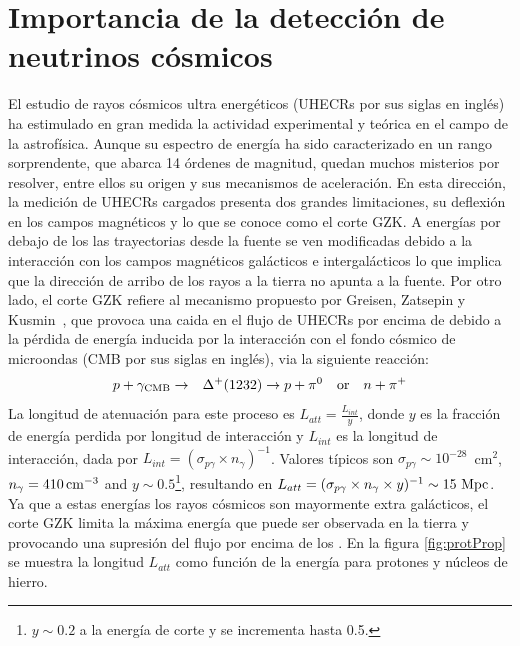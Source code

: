 \section{Importancia de la detecci\'on de neutrinos c\'osmicos}
%
%
%
%
El estudio de rayos c\'osmicos ultra energ\'eticos (UHECRs por sus siglas en ingl\'es) ha estimulado en gran medida la actividad experimental y te\'orica en el campo de la astrof\'isica.
Aunque su espectro de energ\'ia ha sido caracterizado en un rango sorprendente, que abarca 14 \'ordenes de magnitud, quedan muchos misterios por resolver, entre ellos su origen y sus mecanismos de aceleraci\'on.
En esta direcci\'on, la medici\'on de UHECRs cargados presenta dos grandes limitaciones, su deflexi\'on en los campos magn\'eticos y lo que se conoce como el corte GZK.
A energ\'ias por debajo de los  las trayectorias desde la fuente se ven modificadas debido a la interacci\'on con los campos magn\'eticos gal\'acticos e intergal\'acticos lo que implica que la direcci\'on de arribo de los rayos a la tierra no apunta a la fuente.
Por otro lado, el corte GZK refiere al mecanismo propuesto por Greisen, Zatsepin y Kusmin~\cite{cite:Greisen,cite:Zatsepin}, que provoca una caida en el flujo de UHECRs por encima de  debido a la p\'erdida de energ\'ia inducida por la interacci\'on con el fondo c\'osmico de microondas (CMB por sus siglas en ingl\'es), via la siguiente reacci\'on:
%
\begin{eqnarray}
p + \gamma_{\rm CMB} &\rightarrow& \Delta^{+}(1232)  \rightarrow p +\pi^{0}\quad {\rm or}\quad n +\pi^{+}
\end{eqnarray}
%
La longitud de atenuaci\'on para este proceso es $L_{att}=\frac{L_{int}}{y}$, donde $y$ es la fracci\'on de energ\'ia perdida por longitud de interacci\'on y $L_{int}$ es la longitud de interacci\'on, dada por $L_{int}=(\sigma_{p\gamma}\times n_{\gamma})^{-1}$.
Valores t\'ipicos son $\sigma_{p\gamma}\sim 10^{-28}$~cm$^{2}$, $ n_{\gamma}=410\,{\rm cm}^{-3}$ and $y\sim0.5$\footnote{$y\sim0.2$ a la energ\'ia de corte y se incrementa hasta 0.5.}, resultando en 
$L_{att}=(\sigma_{p\gamma}\times n_{\gamma}\times y)^{-1}\sim 15\mbox{ }{\rm Mpc}$. 
Ya que a estas energ\'ias los rayos c\'osmicos son mayormente extra gal\'acticos, el corte GZK limita la m\'axima energ\'ia que puede ser observada en la tierra y provocando una supresi\'on del flujo por encima de los .
En la figura \ref{fig:protProp} se muestra la longitud $L_{att}$ como funci\'on de la energ\'ia para protones y n\'ucleos de hierro. 
